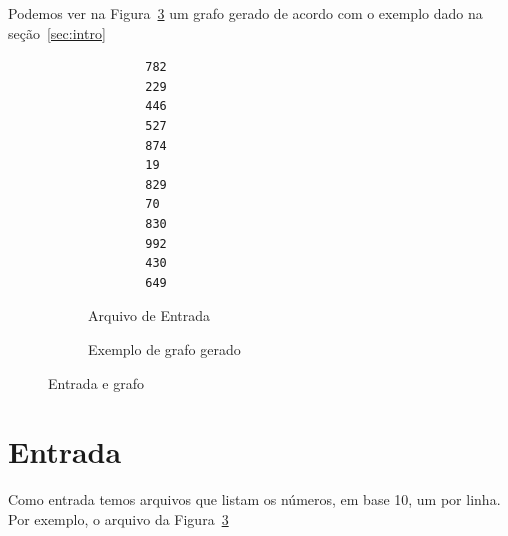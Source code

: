 \documentclass[12pt]{article}
\begin{document}

Podemos ver na Figura~\ref{fig:testeprof} um grafo gerado de acordo com o exemplo dado na se\c{c}ão~\ref{sec:intro}

\begin{figure}[H]
  \noindent %
  \begin{minipage}[t]{0.3\columnwidth}%
    \begin{figure}
        \begin{lstlisting}
        782
        229
        446
        527
        874
        19
        829
        70
        830
        992
        430
        649
        \end{lstlisting}
        \caption{Arquivo de Entrada}
        \label{fig:testeprof:entrada}
      \end{figure}
  \end{minipage}
  \begin{minipage}[t][1\totalheight][b]{0.65\textwidth}%
    \begin{figure}
        \begin{dot2tex}[neato,options=-tmath]
            
        \end{dot2tex}
        \caption{Exemplo de grafo gerado}
        \label{fig:testeprof:grafo}
    \end{figure}
  \end{minipage}
  \caption{Entrada e grafo}
  \label{fig:testeprof}
\end{figure}

\section{Entrada}\label{sec:entrada}
Como entrada temos arquivos que listam os números, em base 10, um por linha. Por exemplo, o arquivo da Figura~\ref{fig:testeprof}
\end{document}
